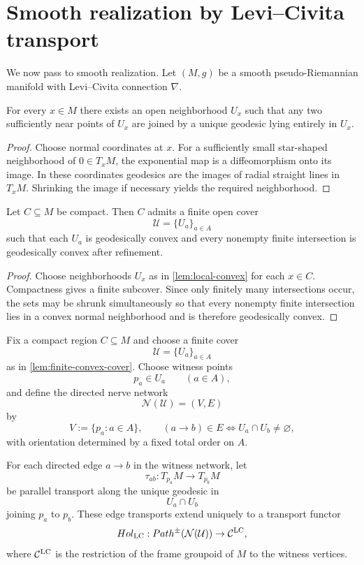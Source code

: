 \section{Smooth realization by Levi--Civita transport}
We now pass to smooth realization.  Let \((M,g)\) be a smooth
pseudo-Riemannian manifold with Levi--Civita connection \(\nabla\).
\begin{lemma}
	\label{lem:local-convex}
	For every \(x\in M\) there exists an open neighborhood \(U_x\) such
	that any two sufficiently near points of \(U_x\) are joined by a
	unique geodesic lying entirely in \(U_x\).
\end{lemma}
\begin{proof}
	Choose normal coordinates at \(x\).  For a sufficiently small
	star-shaped neighborhood of \(0\in T_xM\), the exponential map is a
	diffeomorphism onto its image.  In these coordinates geodesics are the
	images of radial straight lines in \(T_xM\).  Shrinking the image if
	necessary yields the required neighborhood.
\end{proof}
\begin{lemma}
	\label{lem:finite-convex-cover}
	Let \(C\subseteq M\) be compact.  Then \(C\) admits a finite open cover
	\[
		\mathcal U=\{U_a\}_{a\in A}
	\]
	such that each \(U_a\) is geodesically convex and every nonempty finite
	intersection is geodesically convex after refinement.
\end{lemma}
\begin{proof}
	Choose neighborhoods \(U_x\) as in \cref{lem:local-convex} for each
	\(x\in C\).  Compactness gives a finite subcover.  Since only finitely
	many intersections occur, the sets may be shrunk simultaneously so
	that every nonempty finite intersection lies in a convex normal
	neighborhood and is therefore geodesically convex.
\end{proof}
\begin{definition}
	Fix a compact region \(C\subseteq M\) and choose a finite cover
	\[
		\mathcal U=\{U_a\}_{a\in A}
	\]
	as in \cref{lem:finite-convex-cover}.  Choose witness points
	\[
		p_a\in U_a
		\qquad(a\in A),
	\]
	and define the directed nerve network
	\[
		\mathcal N(\mathcal U)=(V,E)
	\]
	by
	\[
		V:=\{p_a:a\in A\},
		\qquad
		(a\to b)\in E \iff U_a\cap U_b\neq\varnothing,
	\]
	with orientation determined by a fixed total order on \(A\).
\end{definition}
\begin{definition}
	\label{def:LC-transport}
	For each directed edge \(a\to b\) in the witness network, let
	\[
		\tau_{ab}:T_{p_a}M\to T_{p_b}M
	\]
	be parallel transport along the unique geodesic in
	\[
		U_a\cap U_b
	\]
	joining \(p_a\) to \(p_b\).
	These edge transports extend uniquely to a transport functor
	\[
		Hol_{\mathrm{LC}}:Path^\pm(\mathcal N(\mathcal U))\to \mathcal C^{\mathrm{LC}},
	\]
	where \(\mathcal C^{\mathrm{LC}}\) is the restriction of the frame groupoid of
	\(M\) to the witness vertices.
\end{definition}
